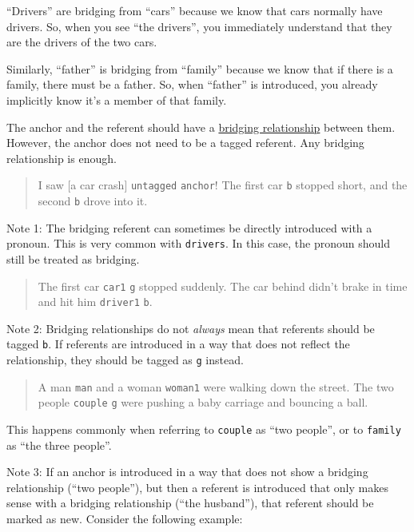 \documentclass[
]{book}
\begin{document}
``Drivers'' are bridging from ``cars'' because we know that cars normally have drivers.
So, when you see ``the drivers'', you immediately understand that they are the drivers of the two cars.

Similarly, ``father'' is bridging from ``family'' because we know that if there is a family, there must be a father.
So, when ``father'' is introduced, you already implicitly know it's a member of that family.

The anchor and the referent should have a
\protect\hyperlink{bridgingux5cux2520relationship}{bridging relationship} between them.
However, the anchor does not need to be a tagged referent.
Any bridging relationship is enough.

\begin{quote}
I saw {[}a car crash{]} \texttt{untagged} \texttt{anchor}!
The first car \texttt{b} stopped short, and the second \texttt{b} drove into it.
\end{quote}

Note 1:
The bridging referent can sometimes be directly introduced with a pronoun.
This is very common with \texttt{drivers}.
In this case, the pronoun should still be treated as bridging.

\begin{quote}
The first car \texttt{car1} \texttt{g} stopped suddenly.
The car behind didn't brake in time and hit him \texttt{driver1} \texttt{b}.
\end{quote}

Note 2:
Bridging relationships do not \emph{always} mean that
referents should be tagged \texttt{b}.
If referents are introduced
in a way that does not reflect the relationship,
they should be tagged as \texttt{g} instead.

\begin{quote}
A man \texttt{man} and a woman \texttt{woman1} were walking down the street.
The two people \texttt{couple} \texttt{g}
were pushing a baby carriage and bouncing a ball.
\end{quote}

This happens commonly when referring to \texttt{couple} as ``two people'',
or to \texttt{family} as ``the three people''.

Note 3:
If an anchor is introduced
in a way that does not show a bridging relationship (``two people''),
but then a referent is introduced
that only makes sense with a bridging relationship (``the husband''),
that referent should be marked as new.
Consider the following example:
\end{document}
